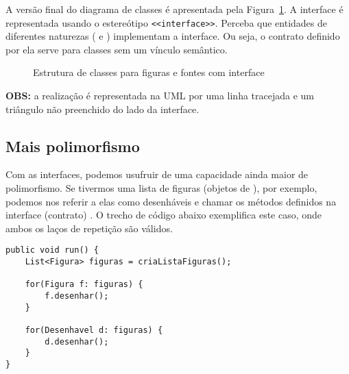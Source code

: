 A versão final do diagrama de classes é apresentada pela Figura~\ref{fig:realizacao-figuras-completo}. A interface é representada usando o estereótipo \texttt{<<interface>>}. Perceba que entidades de diferentes naturezas ( e ) implementam a interface. Ou seja, o contrato definido por ela serve para classes sem um vínculo semântico.

\begin{figure}[h]
	\centering
	
	
	\caption{Estrutura de classes para figuras e fontes com interface}
	\label{fig:realizacao-figuras-completo}
\end{figure}

\textbf{OBS:} a realização é representada na UML por uma linha tracejada e um triângulo não preenchido do lado da interface.

\subsection{Mais polimorfismo}

Com as interfaces, podemos usufruir de uma capacidade ainda maior de polimorfismo. Se tivermos uma lista de figuras (objetos de ), por exemplo, podemos nos referir a elas como desenháveis e chamar os métodos definidos na interface (contrato) . O trecho de código abaixo exemplifica este caso, onde ambos os laços de repetição são válidos.

\begin{verbatim}
public void run() {
	List<Figura> figuras = criaListaFiguras();
	
	for(Figura f: figuras) {
		f.desenhar();
	}
	
	for(Desenhavel d: figuras) {
		d.desenhar();
	}
}
\end{verbatim}

